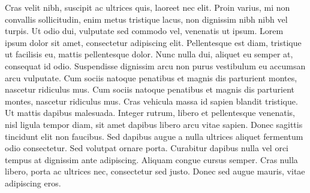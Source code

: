 \documentclass[botnum,fleqn,final]{unmeethesis}
\begin{document}
Cras velit nibh, suscipit ac ultrices quis, laoreet nec elit. Proin varius, mi
non convallis sollicitudin, enim metus tristique lacus, non dignissim nibh nibh
vel turpis. Ut odio dui, vulputate sed commodo vel, venenatis ut ipsum. Lorem
ipsum dolor sit amet, consectetur adipiscing elit. Pellentesque est diam,
tristique ut facilisis eu, mattis pellentesque dolor. Nunc nulla dui, aliquet
eu semper at, consequat id odio. Suspendisse dignissim arcu non purus
vestibulum eu accumsan arcu vulputate. Cum sociis natoque penatibus et magnis
dis parturient montes, nascetur ridiculus mus. Cum sociis natoque penatibus et
magnis dis parturient montes, nascetur ridiculus mus. Cras vehicula massa id
sapien blandit tristique. Ut mattis dapibus malesuada. Integer rutrum, libero
et pellentesque venenatis, nisl ligula tempor diam, sit amet dapibus libero
arcu vitae sapien. Donec sagittis tincidunt elit non faucibus. Sed dapibus
augue a nulla ultrices aliquet fermentum odio consectetur. Sed volutpat ornare
porta. Curabitur dapibus nulla vel orci tempus at dignissim ante adipiscing.
Aliquam congue cursus semper. Cras nulla libero, porta ac ultrices nec,
consectetur sed justo. Donec sed augue mauris, vitae adipiscing eros.




%


\end{document}
